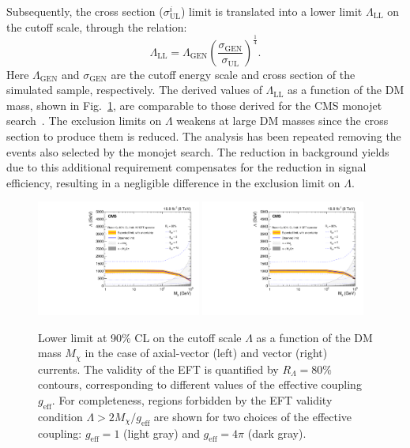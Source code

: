 Subsequently, the cross section ($\sigma^{i}_{\mathrm{UL}}$) limit is translated into a lower limit $\Lambda_{\mathrm{LL}}$ on
the cutoff scale, through the relation:
\begin{equation}
\Lambda_\mathrm{LL} = \Lambda_\text{GEN} \left(\frac{\sigma_\text{GEN}}{\sigma_\mathrm{UL}}\right)^\frac{1}{4}.
\end{equation}
Here $\Lambda_\text{GEN}$ and $\sigma_\text{GEN}$ are the cutoff
energy scale and cross section of the simulated sample, respectively.
The derived values of $\Lambda_\mathrm{LL}$ as a function of the DM mass,
shown in Fig.~\ref{fig:LambdaLimit}, are comparable to those derived
for the CMS monojet search~\cite{monojet8TeV}. The
exclusion limits on $\Lambda$ weakens at large DM masses since the
cross section to produce them is reduced. The analysis has been
repeated removing the events also selected by the monojet search.  The
reduction in background yields due to this additional requirement
compensates for the reduction in signal efficiency, resulting in a
negligible difference in the exclusion limit on $\Lambda$.
\begin{figure}
\centering
\includegraphics[width=0.48\textwidth, angle=0.]{Limits/Final_av_Lambda_VarCoupling_80Percent_vNov9_2015_CWR.pdf}
\includegraphics[width=0.48\textwidth]{Limits/Final_v_Lambda_VarCoupling_80Percent_vNov9_2015_CWR.pdf}
\caption{Lower limit at 90\% CL on the cutoff scale $\Lambda$ as a
  function of the DM mass $M_\chi$ in the case of
  axial-vector (left) and vector (right) currents. The validity of the EFT
  is quantified by $R_\Lambda = 80\%$ contours, corresponding to
  different values of the effective coupling
  $g_\text{eff}$. For completeness, regions forbidden by the
  EFT validity condition $\Lambda > 2M_\chi/g_\text{eff}$  are shown for two choices of the
effective coupling:  $g_\text{eff} = 1$ (light gray) and $g_\text{eff}= 4\pi$ (dark gray).\label{fig:LambdaLimit}}
\end{figure}

